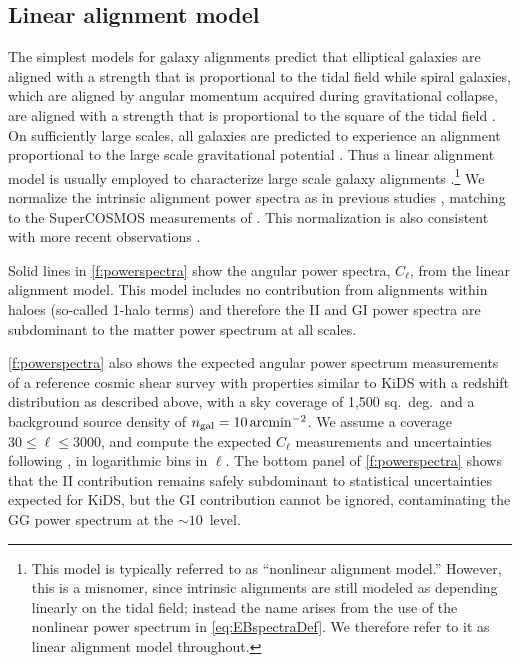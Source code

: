 \subsection{Linear alignment model}\label{s:linear}

The simplest models for galaxy alignments predict that elliptical galaxies are aligned with a 
strength that is proportional to the tidal field \citep{catelan01} while spiral galaxies, which are 
aligned by angular momentum acquired during gravitational collapse, are aligned with a strength 
that is proportional to the square of the tidal field \citep{pen00}. On sufficiently large scales, 
all galaxies are predicted to experience an alignment proportional to the large scale gravitational 
potential \citep{hui02}. Thus a linear alignment model is usually employed to characterize large 
scale galaxy alignments \citep[e.g.,][]{kirk10,joachimi11,mandelbaum11,heymans13}.\footnote{This 
model is typically referred to as ``nonlinear alignment model.'' However, this is a misnomer, 
since intrinsic alignments are still modeled as depending linearly on the tidal field; instead the 
name arises from the use of the nonlinear power spectrum in \cref{eq:EBspectraDef}. We therefore 
refer to it as linear alignment model throughout.} We normalize the intrinsic alignment power 
spectra as in previous studies \citep{hirata04,bridle07,schneider10}, matching to the SuperCOSMOS 
measurements of \cite{brown02}. This normalization is also consistent with more recent observations 
\citep{heymans04,mandelbaum06_ia,joachimi11}.

Solid lines in \cref{f:powerspectra} show the angular power spectra, $C_\ell$, from the linear 
alignment model. This model includes no contribution from alignments within haloes (so-called 1-halo 
terms) and therefore the II and GI power spectra are subdominant to the matter power spectrum at 
all 
scales.

\cref{f:powerspectra} also shows the expected angular power spectrum measurements of a reference 
cosmic shear survey with properties similar to KiDS with a redshift distribution as described 
above, with a sky coverage of 1,500 sq.\ deg.\ and a background source density of $n_{\rm 
gal}=10\,\mathrm{arcmin^{-2}}$. We assume a coverage $30\leq\ell\leq3000$, and compute the expected 
$C_\ell$ measurements and uncertainties following \cite{cooray01}, in logarithmic bins in $\ell$. 
The bottom panel of \cref{f:powerspectra} shows that the II contribution remains safely subdominant 
to statistical uncertainties expected for KiDS, but the GI contribution cannot be ignored, 
contaminating the GG power spectrum at the $\sim10$\percent\ level.


